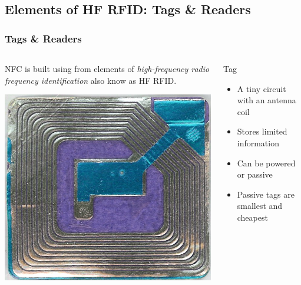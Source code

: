 \documentclass[unknownkeysallowed]{beamer}
\begin{document}
\subsection{Elements of HF RFID: Tags \& Readers}
\begin{frame}
\frametitle{Tags \& Readers}

  \begin{columns}[T]
    \begin{column}{.5\textwidth}
  		\begin{block}{}
  			NFC is built using from elements of \textit{high-frequency radio frequency identification} also know as HF RFID.
  			\newline
  			\newline
  			\begin{center}
    		\includegraphics[scale=.5]{figures/wikimediatag.jpg}
    		\end{center}
    	\end{block}
    \end{column}
    \begin{column}{.5\textwidth}
        \begin{block}{Tag}
		\begin{itemize}
		    \item{A tiny circuit with an antenna coil}
		    \item{Stores limited information}
		    \item{Can be powered or passive}
        	\item{Passive tags are smallest and cheapest}

\end{itemize}
\end{block}
\end{column}
\end{columns}
\end{frame}
\end{document}
